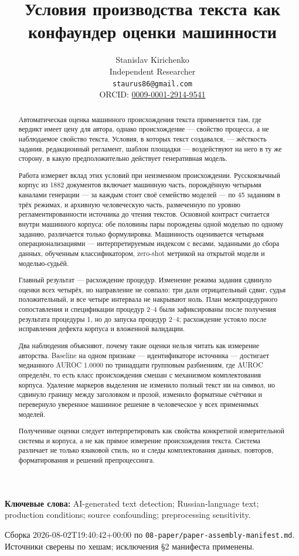 \documentclass[11pt,a4paper]{article}
\title{Условия производства текста как конфаундер оценки машинности}
\author{Stanislav Kirichenko\\
\small Independent Researcher\\
\small \texttt{staurus86@gmail.com}\\
\small ORCID: \href{https://orcid.org/0009-0001-2914-9541}{0009-0001-2914-9541}}
\date{}
\renewcommand{\_}{\textunderscore\allowbreak}
\begin{document}
\maketitle
\begin{abstract}
Автоматическая оценка машинного происхождения текста применяется там, где вердикт
имеет цену для автора, однако происхождение — свойство процесса, а не наблюдаемое
свойство текста. Условия, в которых текст создавался, — жёсткость задания,
редакционный регламент, шаблон площадки — воздействуют на него в ту же сторону, в
какую предположительно действует генеративная модель.

Работа измеряет вклад этих условий при неизменном происхождении. Русскоязычный
корпус из 1882 документов включает машинную часть, порождённую четырьмя
каналами генерации — за каждым стоит своё семейство моделей — по 45 заданиям в
трёх режимах, и архивную человеческую часть,
размеченную по уровню регламентированности источника до чтения текстов. Основной
контраст считается внутри машинного корпуса: обе половины пары порождены одной
моделью по одному заданию, различается только формулировка. Машинность оценивается
четырьмя операционализациями — интерпретируемым индексом с весами, заданными до
сбора данных, обученным классификатором, zero-shot метрикой на открытой модели и
моделью-судьёй.

Главный результат — расхождение процедур. Изменение режима задания сдвинуло оценки
всех четырёх, но направление не совпало: три дали отрицательный сдвиг, судья
положительный, и все четыре интервала не накрывают ноль. План межпроцедурного
сопоставления и спецификации процедур 2–4 были зафиксированы после получения
результата процедуры 1, но до запуска процедур 2–4; расхождение устояло после
исправления дефекта корпуса и вложенной валидации.

Два наблюдения объясняют, почему такие оценки нельзя читать как измерение
авторства. Baseline на одном признаке — идентификаторе источника — достигает
медианного AUROC 1.0000 по тринадцати групповым разбиениям, где AUROC
определён, то есть класс
происхождения смешан с механизмом комплектования корпуса. Удаление маркеров
выделения не изменило полный текст ни на символ, но сдвинуло границу между
заголовком и прозой, изменило форматные счётчики и перевернуло уверенное машинное
решение в человеческое у всех применимых моделей.

Полученные оценки следует интерпретировать как свойства конкретной измерительной
системы и корпуса, а не как прямое измерение происхождения текста. Система
различает не только языковой стиль, но и следы комплектования данных, повторов,
форматирования и решений препроцессинга.
\end{abstract}
\noindent\textbf{Ключевые слова:} AI-generated text detection; Russian-language text; production conditions; source confounding; preprocessing sensitivity.\par\bigskip
{\footnotesize Сборка 2026-08-02T19:40:42+00:00 по \texttt{08-\allowbreak{}paper/paper-\allowbreak{}assembly-\allowbreak{}manifest.md}. Источники сверены по хешам; исключения §2 манифеста применены.\par}
\end{document}
